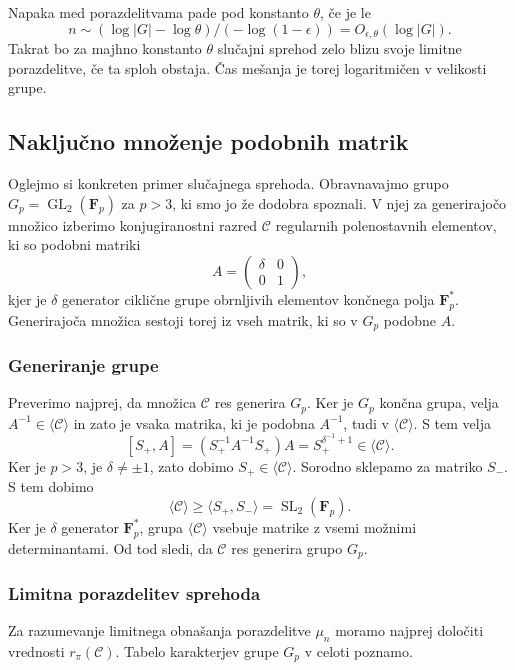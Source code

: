 \documentclass[11pt]{book}
\def\conclass{\mathcal{C}}
\def\FF{\mathbf{F}}
\DeclareMathOperator\GL{GL}
\DeclareMathOperator\SL{SL}
\theoremstyle{definition}
\theoremstyle{zgled}
\theoremstyle{odprtproblem}
\theoremstyle{domacanaloga}
\theoremstyle{izrek}
\begin{document}
Napaka med porazdelitvama pade pod konstanto $\theta$, če je le
\[
n \sim (\log |G| - \log \theta)/(- \log (1 - \epsilon)) = O_{\epsilon, \theta}(\log |G|).
\]
Takrat bo za majhno konstanto $\theta$ slučajni sprehod zelo blizu svoje limitne porazdelitve, če ta sploh obstaja. Čas mešanja je torej logaritmičen v velikosti grupe.

\subsection{Naključno množenje podobnih matrik}

Oglejmo si konkreten primer slučajnega sprehoda. Obravnavajmo grupo $G_p = \GL_2(\FF_p)$ za $p > 3$, ki smo jo že dodobra spoznali. V njej za generirajočo množico izberimo konjugiranostni razred $\conclass$ regularnih polenostavnih elementov, ki so podobni matriki
\[
    A = \begin{pmatrix}
        \delta & 0 \\ 0 & 1 
    \end{pmatrix},
\] 
kjer je $\delta$ generator ciklične grupe obrnljivih elementov končnega polja $\FF_p^*$. Generirajoča množica sestoji torej iz vseh matrik, ki so v $G_p$ podobne $A$.

\subsubsection{Generiranje grupe}

Preverimo najprej, da množica $\conclass$ res generira $G_p$. Ker je $G_p$ končna grupa, velja $A^{-1} \in \langle \conclass \rangle$ in zato je vsaka matrika, ki je podobna $A^{-1}$, tudi v $\langle \conclass \rangle$. S tem velja
\[
    [S_+, A] = (S_+^{-1} A^{-1} S_+) A  = S_+^{\delta^{-1} + 1}
    \in \langle \conclass \rangle.
\]
Ker je $p > 3$, je $\delta \neq \pm 1$, zato dobimo $S_+ \in \langle \conclass \rangle$. Sorodno sklepamo za matriko $S_-$. S tem dobimo
\[
    \textstyle \langle \conclass \rangle \geq \langle S_+, S_- \rangle = \SL_2(\FF_p).
\]
Ker je $\delta$ generator $\FF_p^*$, grupa $\langle \conclass \rangle$ vsebuje matrike z vsemi možnimi determinantami. Od tod sledi, da $\conclass$ res generira grupo $G_p$.

\subsubsection{Limitna porazdelitev sprehoda}

Za razumevanje limitnega obnašanja porazdelitve $\mu_n$ moramo najprej določiti vrednosti $r_{\pi}(\conclass)$. Tabelo karakterjev grupe $G_p$ v celoti poznamo.
\end{document}
